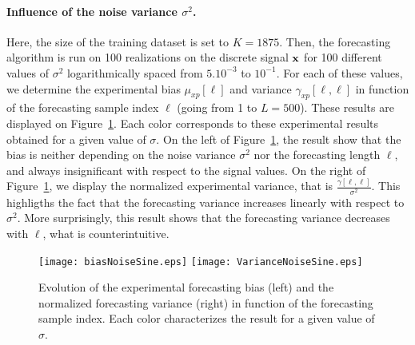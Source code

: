 \paragraph{Influence of the noise variance $\sigma^2$.} Here, the size of the training dataset is set to $K=1875$. Then, the forecasting algorithm is run on 100 realizations on the discrete signal ${\mathbf x}$ for 100 different values of $\sigma^2$  logarithmically spaced from $5.10^{-3}$ to $10^{-1}$. For each of these values, we determine the experimental bias $\mu_{xp}[\ell]$ and variance $\gamma_{xp}[\ell,\ell]$ in function of the forecasting sample index $\ell$ (going from 1 to $L=500$). These results are displayed on Figure~\ref{fig:res.noise.sine}. Each color corresponds to these experimental results obtained for a given value of $\sigma$. On the left of Figure~\ref{fig:res.noise.sine}, the result show that the bias is neither depending on the noise variance $\sigma^2$ nor the forecasting length $\ell$, and always insignificant with respect to the signal values. On the right of Figure~\ref{fig:res.noise.sine}, we display the normalized experimental variance, that is $\frac{\gamma[\ell,\ell]}{\sigma^2}$. This highligths the fact that the forecasting variance increases linearly with respect to $\sigma^2$. More surprisingly, this result shows that the forecasting variance decreases with $\ell$, what is counterintuitive.  
\begin{figure}
\texttt{[image: biasNoiseSine.eps]}
\texttt{[image: VarianceNoiseSine.eps]}
\caption{Evolution of the experimental forecasting bias (left) and the normalized forecasting variance (right) in function of the forecasting sample index. Each color characterizes the result for a given value of $\sigma$.}
\label{fig:res.noise.sine}
\end{figure}

